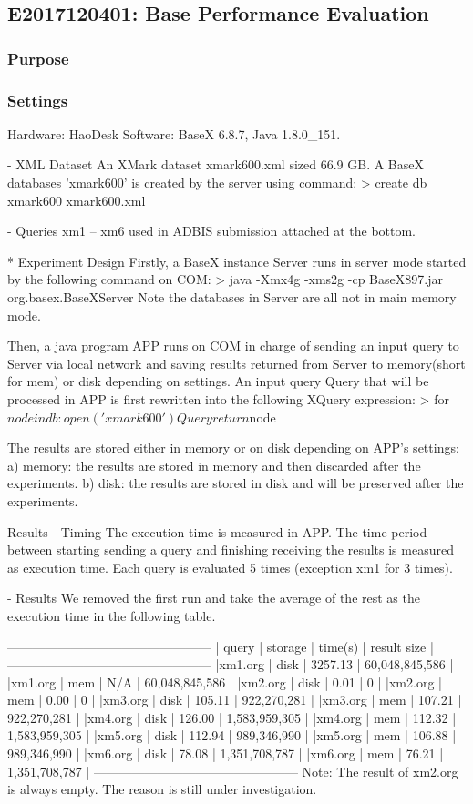 \subsection{E2017120401: Base Performance Evaluation}
 
\subsubsection{Purpose}
 
\subsubsection{Settings} 
Hardware: HaoDesk
Software: BaseX 6.8.7, Java 1.8.0\_151.

- XML Dataset
An XMark dataset xmark600.xml sized 66.9 GB. A BaseX databases
'xmark600' is created by the server using command:
 > create db xmark600 xmark600.xml

- Queries
xm1 -- xm6 used in ADBIS submission attached at the bottom.

* Experiment Design
Firstly, a BaseX instance Server runs in server mode started by
the following command on COM:
  > java -Xmx4g -xms2g -cp BaseX897.jar org.basex.BaseXServer
Note the databases in Server are all not in main memory mode.

Then, a java program APP runs on COM in charge of sending an input
query to Server via local network and saving results returned from
Server to memory(short for mem) or disk depending on settings. An
input query Query that will be processed in APP is first rewritten
into the following XQuery expression:
  > for $node in db:open('xmark600')Query return $node

The results are stored either in memory or on disk depending on APP's
settings:
a) memory: the results are stored in memory and then discarded after
	 the experiments.
b) disk: the results are stored in disk and will be preserved after
   the experiments.


Results
- Timing
The execution time is measured in APP. The time period between
starting sending a query and finishing receiving the results is measured
as execution time. Each query is evaluated 5 times (exception xm1 for 3
times).

- Results
We removed the first run and take the average of the rest as
the execution time in the following table.

------------------------------------------------
| query  | storage | time(s)  |   result size  |
------------------------------------------------
|xm1.org |  disk   | 3257.13  | 60,048,845,586 |
|xm1.org |   mem   |    N/A   | 60,048,845,586 |
|xm2.org |  disk   |    0.01  |              0 |
|xm2.org |   mem   |    0.00  |              0 |
|xm3.org |  disk   |  105.11  |    922,270,281 |
|xm3.org |   mem   |  107.21  |    922,270,281 |
|xm4.org |  disk   |  126.00  |  1,583,959,305 |
|xm4.org |   mem   |  112.32  |  1,583,959,305 |
|xm5.org |  disk   |  112.94  |    989,346,990 |
|xm5.org |   mem   |  106.88  |    989,346,990 |
|xm6.org |  disk   |   78.08  |  1,351,708,787 |
|xm6.org |   mem   |   76.21  |  1,351,708,787 |
------------------------------------------------
Note: The result of xm2.org is always empty. The reason is still
under investigation.

